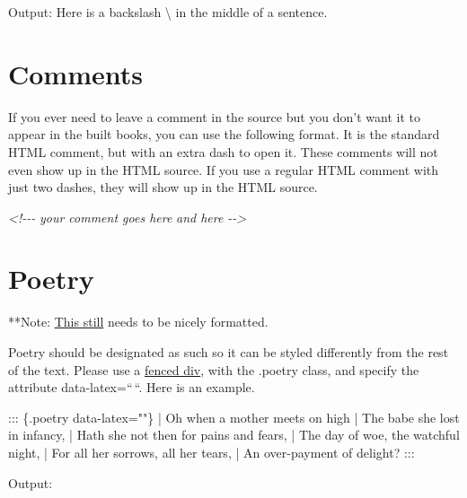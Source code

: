 \documentclass[
  english,
]{book}
\newenvironment{Shaded}{\begin{snugshade}}{\end{snugshade}}
\newcommand{\CommentTok}[1]{\textcolor[rgb]{0.56,0.35,0.01}{\textit{#1}}}
\newcommand{\NormalTok}[1]{#1}
\begin{document}
Output: Here is a backslash \textbackslash{} in the middle of a sentence.

\hypertarget{comments}{%
\chapter{Comments}\label{comments}}

If you ever need to leave a comment in the source but you don't want it to appear in the built books, you can use the following format. It is the standard HTML comment, but with an extra dash to open it. These comments will not even show up in the HTML source. If you use a regular HTML comment with just two dashes, they will show up in the HTML source.

\begin{Shaded}
\begin{Highlighting}[]
\CommentTok{\textless{}!{-}{-}{-}}
\CommentTok{your comment goes here}
\CommentTok{and here}
\CommentTok{{-}{-}\textgreater{}}
\end{Highlighting}
\end{Shaded}

\hypertarget{poetry}{%
\chapter{Poetry}\label{poetry}}

**Note: \href{https://github.com/warhornmedia/classics-documentation/issues/4}{This still} needs to be nicely formatted.

Poetry should be designated as such so it can be styled differently from the rest of the text. Please use a \href{https://pandoc.org/MANUAL.html\#divs-and-spans}{fenced div}, with the .poetry class, and specify the attribute data-latex=``\,``. Here is an example.

\begin{Shaded}
\begin{Highlighting}[]
\NormalTok{::: \{.poetry data{-}latex=""\}}
\NormalTok{| Oh when a mother meets on high}
\NormalTok{| The babe she lost in infancy,}
\NormalTok{| Hath she not then for pains and fears,}
\NormalTok{|     The day of woe, the watchful night,}
\NormalTok{| For all her sorrows, all her tears,}
\NormalTok{|     An over{-}payment of delight?}
\NormalTok{:::}
\end{Highlighting}
\end{Shaded}

Output:
\end{document}
